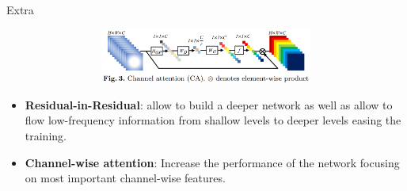 \documentclass{beamer}
\begin{document}
\begin{frame}{Extra}
{\begin{figure}
\begin{subfigure}{0.45\textwidth}
\begin{subfigure}{\textwidth}
                    \includegraphics[width=\textwidth, keepaspectratio]{rcan-channel-attention-module.png}
                \end{subfigure}                
            \end{subfigure}
        \end{figure}
        \begin{itemize}
            \item \textbf{Residual-in-Residual}: allow to build a deeper network as well as allow to flow low-frequency information from shallow levels to deeper levels easing the training. 
            \item \textbf{Channel-wise attention}: Increase the performance of the network focusing on most important channel-wise features.
        \end{itemize}
    }


\end{frame}
\end{document}
